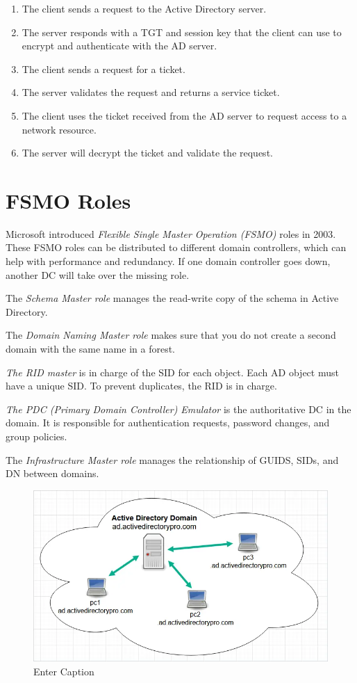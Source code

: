 \begin{enumerate}
    \item The client sends a request to the Active Directory server.
    \item The server responds with a TGT and session key that the client can use to encrypt and authenticate with the AD server.
    \item The client sends a request for a ticket.
    \item The server validates the request and returns a service ticket.
    \item The client uses the ticket received from the AD server to request access to a network resource.
    \item The server will decrypt the ticket and validate the request.
\end{enumerate}

\section{FSMO Roles}
Microsoft introduced \textit{Flexible Single Master Operation (FSMO)} roles in 2003. These FSMO roles can be distributed to different domain controllers, which can help with performance and redundancy. If one domain controller goes down, another DC will take over the missing role.

The \textit{Schema Master role} manages the read-write copy of the schema in Active Directory.

The \textit{Domain Naming Master role} makes sure that you do not create a second domain with the same name in a forest.

\textit{The RID master} is in charge of the SID for each object. Each AD object must have a unique SID. To prevent duplicates, the RID is in charge.

\textit{The PDC (Primary Domain Controller) Emulator} is the authoritative DC in the domain. It is responsible for authentication requests, password changes, and group policies.

The \textit{Infrastructure Master role} manages the relationship of GUIDS, SIDs, and DN between domains.

\begin{figure}
    \centering
    \includegraphics[width=0.75\linewidth]{addom.png}
    \caption{Enter Caption}
    \label{fig:placeholder}
\end{figure}

